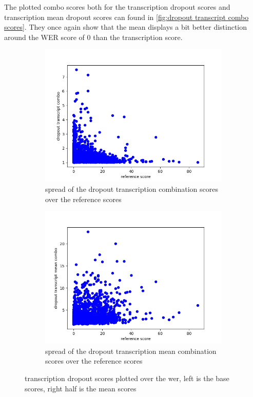 The plotted combo scores both for the transcription dropout scores and transcription mean dropout scores can found in \autoref{fig:dropout transcript combo scores}. They once again show that the mean displays a bit better distinction around the WER score of 0 than the transcription score. 
\begin{figure}
        \centering%
    \begin{subfigure}{0.4\linewidth}
        \includegraphics[width=\textwidth]{Latex/sections/images/seamlessdropouttranscriptcombo.png}
        \caption{spread of the dropout transcription combination scores over the reference scores}
    \end{subfigure}
    \begin{subfigure}{0.4\linewidth}
        \includegraphics[width=\textwidth]{Latex/sections/images/seamlessdropouttranscriptmeancombo.png}
        \caption{spread of the dropout transcription mean combination scores over the reference scores}
    \end{subfigure}
    \caption{transcription dropout scores plotted over the wer, left is the base scores, right half is the mean scores}
    \label{fig:dropout transcript combo scores}
\end{figure}

